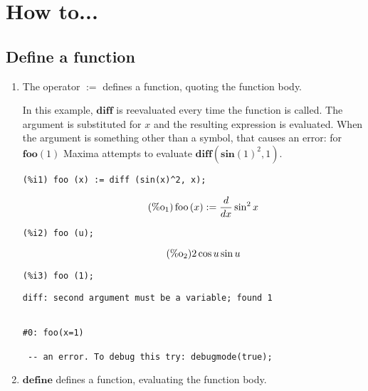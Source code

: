 \documentclass[12pt,leqno]{article}
\begin{document}
\section{How to...}

\subsection{Define a function}

\begin{enumerate}

\item The operator $\mathbf{:=}$ defines a function, quoting the function body.

In this example, $\mathbf{diff}$ is reevaluated every time the function is called.
The argument is substituted for $x$ and the resulting expression is evaluated.
When the argument is something other than a symbol, that causes an error:
for $\mathbf{foo} (1)$ Maxima attempts to evaluate $\mathbf{diff} (\mathbf{sin}(1)^2, 1)$.
\begin{verbatim}
(%i1) foo (x) := diff (sin(x)^2, x);
\end{verbatim}
\begin{equation}
\tag{$\mathop{\mathrm{\%o}_{1}}$}\mathop{\mathrm{foo}}\left(x\right) := \frac{d}{d x}\sin^{2} x
\label{eq:doc-group1-code26-1-1}
\end{equation}
\begin{verbatim}
(%i2) foo (u);
\end{verbatim}
\begin{equation}
\tag{$\mathop{\mathrm{\%o}_{2}}$}2 \cos u \sin u
\label{eq:doc-group1-code26-2-1}
\end{equation}
\begin{verbatim}
(%i3) foo (1);
\end{verbatim}
\begin{Verbatim}
diff: second argument must be a variable; found 1


#0: foo(x=1)

 -- an error. To debug this try: debugmode(true);
\end{Verbatim}


\item $\mathbf{define}$ defines a function, evaluating the function body.


\end{enumerate}
\end{document}
